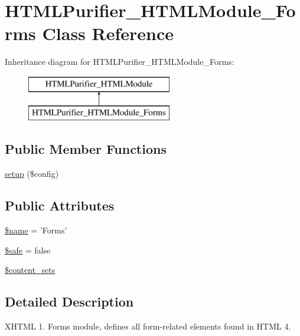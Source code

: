 \hypertarget{classHTMLPurifier__HTMLModule__Forms}{\section{H\+T\+M\+L\+Purifier\+\_\+\+H\+T\+M\+L\+Module\+\_\+\+Forms Class Reference}
\label{classHTMLPurifier__HTMLModule__Forms}
}
Inheritance diagram for H\+T\+M\+L\+Purifier\+\_\+\+H\+T\+M\+L\+Module\+\_\+\+Forms\+:\begin{figure}[H]
\begin{center}
\leavevmode
\includegraphics[height=2.000000cm]{classHTMLPurifier__HTMLModule__Forms}
\end{center}
\end{figure}
\subsection*{Public Member Functions}
\begin{DoxyCompactItemize}
\item 
\hyperlink{classHTMLPurifier__HTMLModule__Forms_a7d402f02b06f1a10f20119d94551a6e5}{setup} (\$config)
\end{DoxyCompactItemize}
\subsection*{Public Attributes}
\begin{DoxyCompactItemize}
\item 
\hyperlink{classHTMLPurifier__HTMLModule__Forms_a8e88ddf919ddbe2def4b30ab19e055fb}{\$name} = 'Forms'
\item 
\hyperlink{classHTMLPurifier__HTMLModule__Forms_a242c1674d909d22435954c43df3fc9c3}{\$safe} = false
\item 
\hyperlink{classHTMLPurifier__HTMLModule__Forms_a9e515244b705047039d88081e7440d7d}{\$content\+\_\+sets}
\end{DoxyCompactItemize}


\subsection{Detailed Description}
X\+H\+T\+M\+L 1. Forms module, defines all form-\/related elements found in H\+T\+M\+L 4. 

